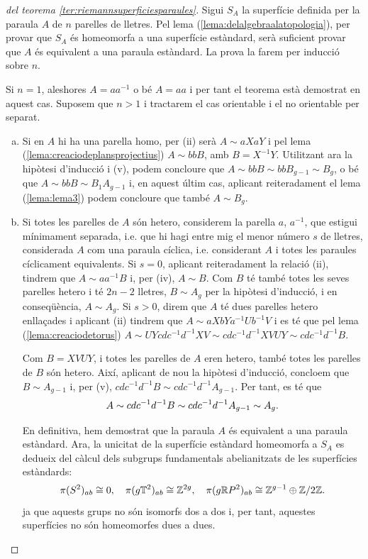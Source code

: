 \documentclass[../main.tex]{subfiles}
\begin{document}
\begin{proof}
[del teorema \ref{ter:riemannsuperficiesparaules}] Sigui $S_A$ la superfície definida per la paraula $A$ de $n$ parelles de lletres. Pel lema (\ref{lema:delalgebraalatopologia}), per provar que $S_A$ és homeomorfa a una superfície estàndard, serà suficient provar que $A$ és equivalent a una paraula estàndard. La prova la farem per inducció sobre $n$.

Si $n=1$, aleshores $A = aa^{-1}$ o bé $A = aa$ i per tant el teorema està demostrat en aquest cas. Suposem que $n>1$ i tractarem el cas orientable i el no orientable per separat.
\begin{enumerate}[(a)]
    \item Si en $A$ hi ha una parella homo, per (ii) serà $A\sim aXaY$ i pel lema (\ref{lema:creaciodeplansprojectius}) $A\sim bbB$, amb $B = X^{-1}Y$. Utilitzant ara la hipòtesi d'inducció i (v), podem concloure que $A\sim bbB\sim bbB_{g-1}\sim B_g$, o bé que $A\sim bbB\sim B_1A_{g-1}$ i, en aquest últim cas, aplicant reiteradament el lema (\ref{lema:lema3}) podem concloure que també $A\sim B_g$.
    \item Si totes les parelles de $A$ són hetero, considerem la parella $a$, $a^{-1}$, que estigui mínimament separada, i.e. que hi hagi entre mig el menor número $s$ de lletres, considerada $A$ com una paraula cíclica, i.e. considerant $A$ i totes les paraules cíclicament equivalents. Si $s=0$, aplicant reiteradament la relació (ii), tindrem que $A\sim aa^{-1}B$ i, per (iv), $A\sim B$. Com $B$ té també totes les seves parelles hetero i té $2n-2$ lletres, $B\sim A_g$ per la hipòtesi d'inducció, i en conseqüència, $A\sim A_g$. Si $s>0$, direm que $A$ té dues parelles hetero enllaçades i aplicant (ii) tindrem que $A\sim aXbYa^{-1}Ub^{-1}V$ i es té que pel lema (\ref{lema:creaciodetorus}) $A\sim UYcdc^{-1}d^{-1}XV\sim cdc^{-1}d^{-1}XVUY\sim cdc^{-1}d^{-1}B$.
    
    Com $B = XVUY$, i totes les parelles de $A$ eren hetero, també totes les parelles de $B$ són hetero. Així, aplicant de nou la hipòtesi d'inducció, concloem que $B\sim A_{g-1}$ i, per (v), $cdc^{-1}d^{-1}B\sim cdc^{-1}d^{-1}A_{g-1}$. Per tant, es té que
    \begin{equation}
        \notag
        A\sim cdc^{-1}d^{-1}B\sim cdc^{-1}d^{-1}A_{g-1}\sim A_g.
    \end{equation}
    
    En definitiva, hem demostrat que la paraula $A$ és equivalent a una paraula estàndard. Ara, la unicitat de la superfície estàndard homeomorfa a $S_A$ es dedueix del càlcul dels subgrups fundamentals abelianitzats de les superfícies estàndards:
    \begin{equation}
        \notag
        \pi(S^2)_{ab}\cong 0,\quad \pi(g\mathbb{T}^2)_{ab}\cong\mathbb{Z}^{2g},\quad \pi(g\mathbb{R}P^2)_{ab}\cong \mathbb{Z}^{g-1}\oplus\mathbb{Z}/2\mathbb{Z}.
    \end{equation}
    ja que aquests grups no són isomorfs dos a dos i, per tant, aquestes superfícies no són homeomorfes dues a dues.
\end{enumerate}
\end{proof}
\end{document}
